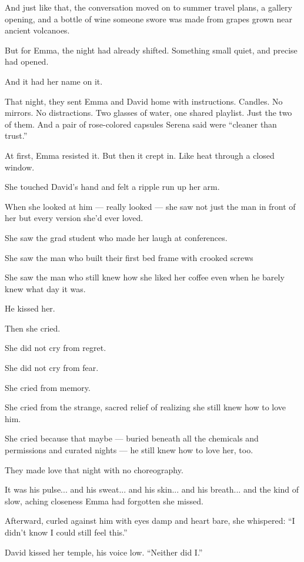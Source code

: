 And just like that, the conversation moved on to summer travel plans, a gallery opening, and a bottle of wine 
someone swore was made from grapes grown near ancient volcanoes.

But for Emma, the night had already shifted. Something small quiet, and precise had opened. 

And it had her name on it.

That night, they sent Emma and David home with instructions. Candles. No mirrors. No 
distractions. Two glasses of water, one shared playlist. Just the two of them. And a pair 
of rose-colored capsules Serena said were “cleaner than trust.”

At first, Emma resisted it. But then it crept in. Like heat through 
a closed window.

She touched David’s hand and felt a ripple run up her arm. 

When she looked at him --- really looked --- she saw not just the man in front of her but every 
version she’d ever loved.

She saw the grad student who made her laugh at conferences.

She saw the man who built their first bed frame with crooked screws

She saw the man who still knew how she liked her coffee even when he barely knew what day it was.

He kissed her.

Then she cried.

She did not cry from regret. 

She did not cry from fear.

She cried from memory.

She cried from the strange, sacred relief of realizing she still knew how to love him.

She cried because that maybe --- buried beneath all the chemicals and permissions and curated nights --- 
he still knew how to love her, too.

They made love that night with no choreography. 

It was his pulse... and his sweat... and his skin... and his breath... and the kind of slow, 
aching closeness Emma had forgotten she missed.

Afterward, curled against him with eyes damp and heart bare, she whispered:
``I didn’t know I could still feel this.''

David kissed her temple, his voice low.
``Neither did I.''

